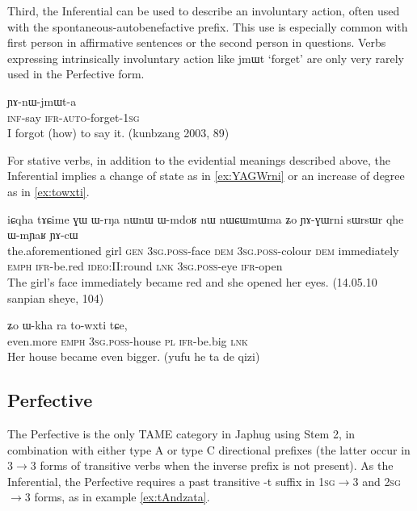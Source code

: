 \documentclass[oldfontcommands,oneside,a4paper,11pt]{article}
\newcommand{\ipa}[1]{{\phon \mbox{#1}}} %
\begin{document}
Third, the Inferential can be used to describe an involuntary action, often used with the spontaneous-autobenefactive prefix. This use is especially common with first person in affirmative sentences or the second person in questions. Verbs expressing intrinsically involuntary action like \ipa{jmɯt} `forget' are only very rarely used in the Perfective form.

\begin{exe}
\ex 
\gll \ipa{kɤ-ti} \ipa{ɲɤ-nɯ-jmɯt-a} \\
\textsc{inf}-say  \textsc{ifr-auto}-forget-\textsc{1sg} \\
\glt I forgot (how) to say it. (kunbzang 2003, 89)
\end{exe}

For stative verbs, in addition to the evidential meanings described above, the Inferential implies a change of state as in \ref{ex:YAGWrni} or an increase of degree as in \ref{ex:towxti}.


\begin{exe}
\ex \label{ex:YAGWrni}
\gll 
\ipa{iɕqha} 	\ipa{tɤɕime} 	\ipa{ɣɯ} 	\ipa{ɯ-rŋa} 	\ipa{nɯnɯ} 	\ipa{ɯ-mdoʁ} 	\ipa{nɯ} 	\ipa{nɯɕɯmɯma} 	\ipa{ʑo} 	\ipa{ɲɤ-ɣɯrni} 	\ipa{sɯrsɯr} 	\ipa{qhe} 	\ipa{ɯ-mɲaʁ} 	\ipa{ɲɤ-cɯ}\\
the.aforementioned girl \textsc{gen} \textsc{3sg.poss}-face \textsc{dem} \textsc{3sg.poss}-colour \textsc{dem} immediately \textsc{emph} \textsc{ifr}-be.red \textsc{ideo}:II:round \textsc{lnk} \textsc{3sg.poss}-eye \textsc{ifr}-open \\
\glt The girl's face immediately became red and she opened her eyes. (14.05.10 sanpian sheye, 104)
\end{exe}

\begin{exe}
\ex \label{ex:towxti}
\gll \ipa{mɤʑɯ} 	\ipa{ʑo} 	\ipa{ɯ-kha} 	\ipa{ra} 	\ipa{to-wxti} 	\ipa{tɕe,} \\
even.more \textsc{emph} \textsc{3sg.poss}-house \textsc{pl} \textsc{ifr}-be.big \textsc{lnk} \\
\glt Her house became even bigger. (yufu he ta de qizi)
\end{exe}



\subsection{Perfective}  \label{sec:pfv}
The Perfective is the only TAME category in Japhug using Stem 2, in combination with either type A or type C directional prefixes (the latter occur in 3$\rightarrow$3 forms of transitive verbs when the inverse prefix is not present). As the Inferential, the Perfective requires a past transitive \ipa{-t} suffix in  \textsc{1sg}$\rightarrow$3 and \textsc{2sg}$\rightarrow$3 forms, as in example \ref{ex:tAndzata}.
\end{document}
